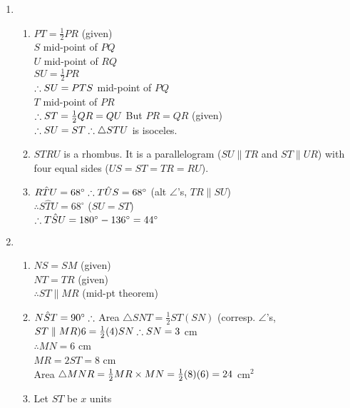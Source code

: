 \begin{eocsolutions}{}
{\begin{enumerate}[itemsep=5pt, label=\textbf{\arabic*}. ]
\item %
 \begin{enumerate}[noitemsep, label=\textbf{(\alph*)} ]
\item
$PT=\frac{1}{2} PR$ (given)\\
$S$ mid-point of $PQ$\\
$U$ mid-point of $RQ$\\
$SU=\frac{1}{2}PR$\\
$\therefore SU=PT\\
S$ mid-point of $PQ$\\
$T$ mid-point of $PR$\\
$\therefore ST = \frac{1}{2}QR=QU\\$
But $PR=QR$ (given)\\
$\therefore SU=ST\\
\therefore \triangle STU$ is isoceles.
\item $STRU$ is a rhombus. It is a parallelogram ($SU \parallel TR$ and $ST \parallel UR$) with four equal sides ($US=ST=TR=RU$).
\item $R\hat{T}U = 68^{\circ}\\
\therefore T\hat{U}S = 68^{\circ}$ (alt $\angle$'s, $TR \parallel SU$)\\
$\therefore S\hat{T}U = 68^{\circ}$ ($SU=ST$)\\
$\therefore T\hat{S}U = 180^{\circ} - 136^{\circ}\\
=44^{\circ}$
\end{enumerate}
\item %
 \begin{enumerate}[noitemsep, label=\textbf{(\alph*)} ]
\item $NS=SM$ (given)\\
$NT=TR$ (given)\\
$\therefore ST \parallel MR$ (mid-pt theorem)
\item $N\hat{S}T = 90^{\circ}\\
\therefore $ Area $\triangle SNT=\frac{1}{2} ST(SN)$ (corresp. $\angle$'s, $ST\parallel MR)\\
6 = \frac{1}{2}(4)SN\\
\therefore SN = 3$ cm\\
$\therefore MN = 6$ cm\\
$MR = 2ST = 8$ cm\\
Area $\triangle MNR = \frac{1}{2} MR \times MN\\
=\frac{1}{2} (8)(6)\\
=24$ cm$^2$
\item Let $ST$ be $x$ units\\

\end{enumerate}
\end{enumerate}}
\end{eocsolutions}
